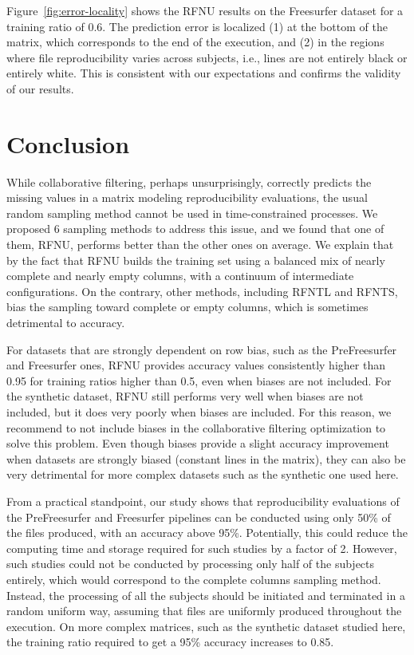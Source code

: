 \documentclass[10pt, conference, compsocconf]{IEEEtran}
\begin{document}
Figure~\ref{fig:error-locality} shows the RFNU results on 
the Freesurfer dataset for a training ratio of 0.6. The prediction 
error is localized (1) at the bottom of the matrix, which corresponds 
to the end of the execution, and (2) in the regions where file 
reproducibility varies across subjects, i.e., lines are not entirely 
black or entirely white. This is consistent with our expectations and 
confirms the validity of our results.

\section{Conclusion}

While collaborative filtering, perhaps unsurprisingly, correctly 
predicts the missing values in a matrix modeling reproducibility 
evaluations, the usual random sampling method cannot be used in 
time-constrained processes. We proposed 6 sampling methods to address 
this issue, and we found that one of them, RFNU, performs 
better than the other ones on average. We 
explain that by the fact that RFNU builds the training set using a 
balanced mix of nearly complete and nearly empty columns, with a 
continuum of 
intermediate configurations. On the contrary, other 
methods, including RFNTL and RFNTS, bias the sampling toward complete 
or empty columns, which is sometimes detrimental to accuracy.

For datasets that are strongly dependent on row bias, such as the 
PreFreesurfer and Freesurfer ones, RFNU provides 
accuracy values consistently higher than 0.95 for training 
ratios higher than 0.5, even 
when biases are not included. For the synthetic dataset, RFNU still performs very well 
when biases are not included, but it does very poorly when biases are included.
For this reason, we recommend to not include biases in the collaborative filtering 
optimization to solve this problem. Even though biases provide a slight 
accuracy improvement when datasets are strongly biased (constant lines 
in the matrix), they can also be very detrimental for more complex 
datasets such as the synthetic one used here.

From a practical standpoint, our study shows that reproducibility 
evaluations of the PreFreesurfer and Freesurfer pipelines can be 
conducted using only 50\% of the files produced, with an accuracy above 
95\%. Potentially, this could reduce the computing time and storage 
required for such studies by a factor of 2. However, such studies could 
not be conducted by processing only half of the subjects entirely, 
which would correspond to the complete columns sampling method. 
Instead, the processing of all the subjects should be initiated and 
terminated in a random uniform way, assuming that files are uniformly 
produced throughout the execution. On more complex matrices, such as 
the synthetic dataset studied here, the training ratio required 
to get a 95\% accuracy increases to 0.85.
\end{document}

